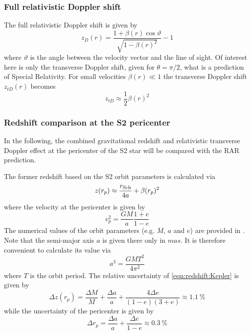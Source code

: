 \subsubsection*{Full relativistic Doppler shift}
The full relativistic Doppler shift is given by \begin{equation}
	\label{eqn:Doppler-shift}
	z_D(r) = \frac{1 + \beta(r) \cos\vartheta}{\sqrt{1 - \beta(r)^2}} - 1
\end{equation} where $\vartheta$ is the angle between the velocity vector and the line of sight. Of interest here is only the transverse Doppler shift, given for $\theta=\pi/2$, what is a prediction of Special Relativity. For small velocities $\beta(r) \ll 1$ the transverse Doppler shift $z_{tD}(r)$ becomes \begin{equation}
	z_{tD} \approx \frac12 \beta(r)^2
\end{equation}


\subsubsection*{Redshift comparison at the S2 pericenter}
In the following, the combined gravitational redshift and relativistic transverse Doppler effect at the pericenter of the S2 star will be compared with the RAR prediction.

The former redshift based on the S2 orbit parameters is calculated via \begin{equation}
	\label{eqn:redshift:Kepler}
	z(r_p) \approx \frac{r_{\rm Sch}}{4a} + \beta(r_p)^2
\end{equation} where the velocity at the pericenter is given by \begin{equation}
	v_p^2 = \frac{G M}{a} \frac{1 + e}{1 - e}
\end{equation} The numerical values of the orbit parameters (e.g. $M$, $a$ and $e$) are provided in \citet[][Table A.1]{2018A&A...615L..15G}. Note that the semi-major axis $a$ is given there only in $mas$. It is therefore convenient to calculate its value via \begin{equation}
	a^3 = \frac{G M T^2}{4 \pi^2}
\end{equation} where $T$ is the orbit period. The relative uncertainty of \cref{eqn:redshift:Kepler} is given by \begin{equation}
	\Delta z(r_p) = \frac{\Delta M}{M} + \frac{\Delta a}{a} + \frac{4 \Delta e}{(1 - e)(3 + e)} \approx \SI{1.1}{\percent}
\end{equation} while the uncertainty of the pericenter is given by \begin{equation}
	\Delta r_p = \frac{\Delta a}{a} + \frac{\Delta e}{1 - e} \approx \SI{0.3}{\percent}
\end{equation}

